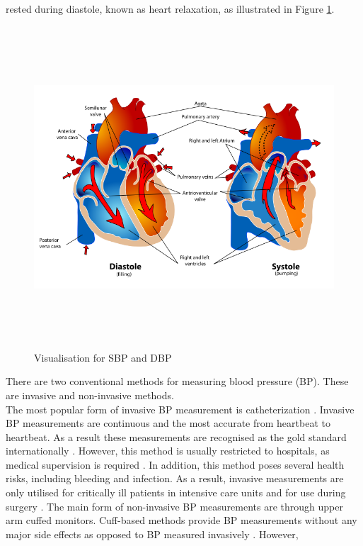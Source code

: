 rested during  diastole, known as heart  relaxation, as illustrated in Figure \ref{diastoleSystole}. \begin{figure}[H]
    \centering
    \includegraphics[width=12cm,height=12cm,keepaspectratio]{Background/sbp_dbp.png}
    \caption{Visualisation for SBP and DBP \cite{SBP}}
    \label{diastoleSystole}
\end{figure} \noindent There 
are two  conventional  methods  for  measuring  blood  pressure (BP). These 
are invasive   and   non-invasive methods. \\ \newline \noindent  The most popular form of invasive  BP 
measurement is  catheterization \cite{Zaki2018}. Invasive BP measurements 
are continuous and the most accurate from heartbeat to heartbeat. As a result 
these measurements are recognised as the gold standard 
internationally \cite{Sharma2017} \cite{ElHajj2020}. However, this method is 
usually restricted to hospitals, as medical supervision is required \cite{Pradenas2020}. 
In addition, this method poses several health risks, including bleeding and 
infection. As a result, invasive measurements are only utilised for critically 
ill patients in intensive care units and for use during 
surgery \cite{Zaki2018}\cite{ElHajj2020}. The main form of non-invasive BP measurements are through 
upper arm cuffed monitors. Cuff-based methods provide BP measurements without 
any major side effects as opposed to BP measured invasively \cite{ElHajj2020}. However, 
